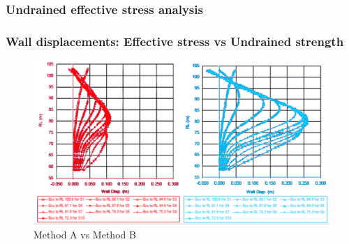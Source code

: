 \documentclass[handout]{beamer}
\begin{document}
\begin{frame}
\frametitle{Undrained effective stress analysis}
\end{frame}

\begin{frame}
\frametitle{Wall displacements: Effective stress vs Undrained strength}
\begin{figure}[ht]
	\centering
	\includegraphics[width=\textwidth]{figs/wall-disp.png}
	\caption*{Method A vs Method B}
\end{figure}
\end{frame}
\end{document}
